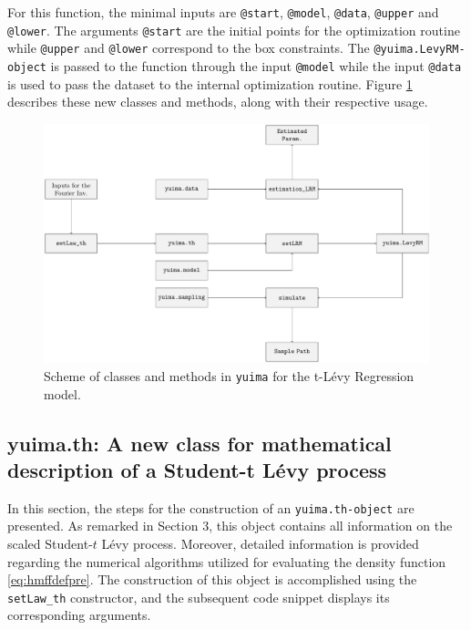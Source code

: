For this function, the minimal inputs are \texttt{@start}, \texttt{@model}, \texttt{@data}, \texttt{@upper} and \texttt{@lower}. The arguments \texttt{@start} are the initial points for the optimization routine while \texttt{@upper} and \texttt{@lower} correspond to the box constraints. The \texttt{@yuima.LevyRM-object} is passed to the function through the input \texttt{@model} while the input \texttt{@data} is used to pass the dataset to the internal optimization routine. Figure \ref{fig:tLRm} describes these new classes and methods, along with their respective usage.

\begin{figure}

{\centering \includegraphics[width=1\linewidth]{figures/Tikz_standalone} 

}

\caption{Scheme of classes and methods in \texttt{yuima} for the t-Lévy Regression model.}\label{fig:tLRm}
\end{figure}

\subsection{yuima.th: A new class for mathematical description of a Student-t Lévy process}\label{yuimath}

In this section, the steps for the construction of an \texttt{yuima.th-object} are presented. As remarked in Section 3, this object contains all information on the scaled Student-\(t\) Lévy process. Moreover, detailed information is provided regarding the numerical algorithms utilized for evaluating the density function \eqref{eq:hmffdefpre}. The construction of this object is accomplished using the \texttt{setLaw\_th} constructor, and the subsequent code snippet displays its corresponding arguments.

